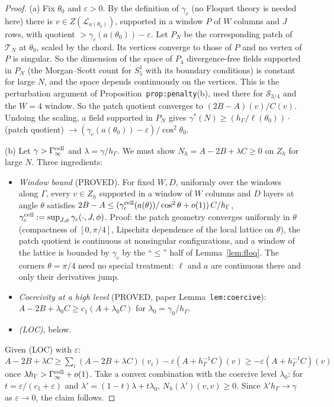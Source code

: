 \documentclass[11pt]{article}
\theoremstyle{definition}
\theoremstyle{remark}
\newcommand{\hG}{h_\Gamma}
\newcommand{\Zh}{Z_h}
\begin{document}
\begin{proof}
(a) Fix $\theta_0$ and $\varepsilon>0$. By the definition of $\gamma_c$ (no Floquet theory is needed here) there is $v\in Z(\mathcal L_{a(\theta_0)})$, supported in a window $P$ of $W$ columns and $J$ rows, with quotient $>\gamma_c(a(\theta_0))-\varepsilon$. Let $P_N$ be the corresponding patch of $\mathcal T_N$ at $\theta_0$, scaled by the chord. Its vertices converge to those of $P$ and no vertex of $P$ is singular. So the dimension of the space of $P_4$ divergence-free fields supported in $P_N$ (the Morgan--Scott count for $S^1_5$ with its boundary conditions) is constant for large $N$, and the space depends continuously on the vertices. This is the perturbation argument of Proposition~\texttt{prop:penalty}(b), used there for $\mathcal S_{3/4}$ and the $W=4$ window. So the patch quotient converges to $(2B-A)(v)/C(v)$. Undoing the scaling, a field supported in $P_N$ gives $\gamma^\ast(N)\ge(\hG/\ell(\theta_0))\cdot$ (patch quotient) $\to(\gamma_c(a(\theta_0))-\varepsilon)/\cos^2\theta_0$.

(b) Let $\gamma>\Gamma^{\rm cell}_\infty$ and $\lambda=\gamma/\hG$. We must show $N_h=A-2B+\lambda C\ge0$ on $\Zh$ for large $N$. Three ingredients:
\begin{itemize}
\item \emph{Window bound} (PROVED). For fixed $W,D$, uniformly over the windows along $\Gamma$, every $v\in\Zh$ supported in a window of $W$ columns and $D$ layers at angle $\theta$ satisfies $2B-A\le(\gamma^{\rm cell}_c(a(\theta))/\cos^2\theta+o(1))\,C/\hG$, $\gamma^{\rm cell}_c:=\sup_{J,\phi}\gamma_c(\cdot,J,\phi)$. Proof: the patch geometry converges uniformly in $\theta$ (compactness of $[0,\pi/4]$, Lipschitz dependence of the local lattice on $\theta$), the patch quotient is continuous at nonsingular configurations, and a window of the lattice is bounded by $\gamma_c$ by the ``$\le$'' half of Lemma~\ref{lem:floq}. The corners $\theta=\pi/4$ need no special treatment: $\ell$ and $a$ are continuous there and only their derivatives jump.
\item \emph{Coercivity at a high level} (PROVED, paper Lemma~\texttt{lem:coercive}): $A-2B+\lambda_0C\ge c_1(A+\lambda_0C)$ for $\lambda_0=\gamma_0/\hG$.
\item \emph{(LOC)}, below.
\end{itemize}
Given (LOC) with $\varepsilon$: $A-2B+\lambda C\ge\sum_i(A-2B+\lambda C)(v_i)-\varepsilon(A+\hG^{-1}C)(v)\ge-\varepsilon(A+\hG^{-1}C)(v)$ once $\lambda\hG>\Gamma^{\rm cell}_\infty+o(1)$. Take a convex combination with the coercive level $\lambda_0$: for $t=\varepsilon/(c_1+\varepsilon)$ and $\lambda'=(1-t)\lambda+t\lambda_0$, $N_h(\lambda')(v,v)\ge0$. Since $\lambda'\hG\to\gamma$ as $\varepsilon\to0$, the claim follows.
\end{proof}
\end{document}

